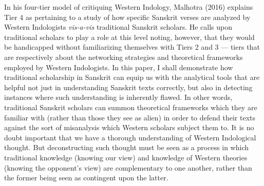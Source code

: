 In his four-tier model of critiquing Western Indology, Malhotra (2016) explains Tier 4 as pertaining to a study of how specific Sanskrit verses are analyzed by Western Indologists \textsl{vis-a-vis} traditional Sanskrit scholars. He calls upon traditional scholars to play a role at this level noting, however, that they would be handicapped without familiarizing themselves with Tiers 2 and 3 --- tiers that are respectively about the networking strategies and theoretical frameworks employed by Western Indologists. In this paper, I shall demonstrate how traditional scholarship in Sanskrit can equip us with the analytical tools that are helpful not just in understanding Sanskrit texts correctly, but also in detecting instances where such understanding is inherently flawed. In other words, traditional Sanskrit scholars can summon theoretical frameworks which they are familiar with (rather than those they see as alien) in order to defend their texts against the sort of misanalysis which Western scholars subject them to. It is no doubt important that we have a thorough understanding of Western Indological thought. But deconstructing such thought must be seen as a process in which traditional knowledge (knowing our view) and knowledge of Western theories (knowing the opponent’s view) are complementary to one another, rather than the former being seen as contingent upon the latter. 

